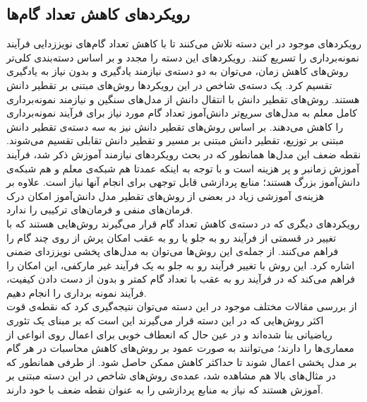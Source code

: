 \subsection{رویکرد‌های کاهش تعداد گام‌ها}
رویکرد‌های موجود در این دسته تلاش می‌کنند تا با کاهش تعداد گام‌های نویززدایی فرآیند نمونه‌برداری را تسریع کنند. رویکرد‌های این دسته را مجدد و بر اساس دسته‌بندی کلی‌تر روش‌های کاهش زمان، می‌توان به دو دسته‌ی نیازمند یادگیری و بدون نیاز به یادگیری تقسیم کرد\cite{ma2024efficient}. یک دسته‌ی شاخص در این رویکرد‌ها روش‌های مبتنی بر تقطیر دانش هستند. روش‌های تقطیر دانش با انتقال دانش از مدل‌های سنگین و نیازمند نمونه‌برداری کامل معلم به مدل‌های سریع‌تر دانش‌آموز تعداد گام مورد نیاز برای فرآیند نمونه‌برداری را کاهش می‌دهند. بر اساس \cite{ma2024efficient} روش‌های تقطیر دانش نیز به سه دسته‌ی تقطیر دانش مبتنی بر توزیع، تقطیر دانش مبتنی بر مسیر و تقطیر دانش تقابلی تقسیم می‌شوند. نقطه ضعف این مدل‌ها همانطور که در بحث رویکرد‌های نیازمند آموزش ذکر شد، فرآیند آموزش زمانبر و پر هزینه است و با توجه به اینکه عمدتا هم شبکه‌ی معلم و هم شبکه‌ی دانش‌آموز بزرگ هستند؛ منابع پردازشی قابل توجهی برای انجام آنها نیاز است. علاوه بر هزینه‌ی آموزشی زیاد در بعضی از روش‌های تقطیر مدل دانش‌آموز امکان درک فرمان‌های منفی و فرمان‌های ترکیبی را ندارد\cite{wimbauer2024cache}.
\\
رویکرد‌های دیگری که در دسته‌ی کاهش تعداد گام قرار می‌گیرند روش‌هایی هستند که با تغییر در قسمتی از فرآیند رو به جلو یا رو به عقب امکان پرش از روی چند گام را فراهم می‌کنند. از جمله‌ی این روش‌ها می‌توان به مدل‌های پخشی نویززدای ضمنی \cite{song2020denoising} اشاره کرد. این روش با تغییر فرآیند رو به جلو به یک فرآیند غیر مارکفی، این امکان را فراهم می‌کند که در فرآیند رو به عقب با تعداد گام کمتر و بدون از دست دادن کیفیت، فرآیند نمونه برداری را انجام دهیم.
\\
از بررسی مقالات مختلف موجود در این دسته می‌توان نتیجه‌گیری کرد که نقطه‌ی قوت اکثر روش‌هایی که در این دسته قرار می‌گیرند این است که بر مبنای یک تئوری ریاضیاتی بنا شده‌اند و در عین حال که انعطاف خوبی برای اعمال روی انواعی از معماری‌ها را دارند؛ می‌توانند به صورت عمود بر روش‌های کاهش محاسبات در هر گام بر مدل‌ پخشی اعمال شوند تا حداکثر کاهش ممکن حاصل شود. از طرفی همانطور که در مثال‌های بالا هم مشاهده شد، عمده‌ی روش‌های شاخص در این دسته مبتنی بر آموزش هستند که نیاز به منابع پردازشی را به عنوان نقطه ضعف با خود دارند.
\\
